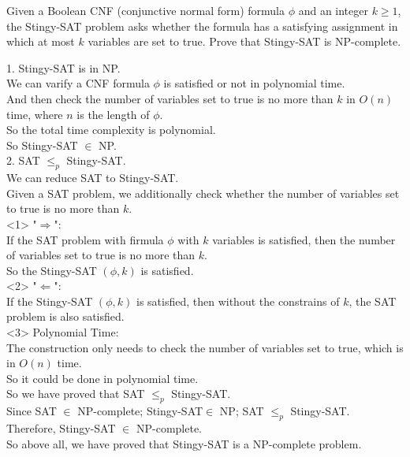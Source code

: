 \problem{}

Given a Boolean CNF (conjunctive normal form) formula $\phi$ and an integer $k \geq 1$, the Stingy-SAT problem asks whether the formula has a satisfying assignment in which at most $k$ variables are set to true. Prove that Stingy-SAT is NP-complete.

\solution{}

1. Stingy-SAT is in NP.\\
We can varify a CNF formula \(\phi\) is satisfied or not in polynomial time.\\
And then check the number of variables set to true is no more than \(k\) in $O(n)$ time, where $n$ is the length of $\phi$.\\
So the total time complexity is polynomial.\\
So Stingy-SAT $\in$ NP.\\

2. SAT $\leq_p$ Stingy-SAT.\\
We can reduce SAT to Stingy-SAT.\\
Given a SAT problem, we additionally check whether the number of variables set to true is no more than \(k\).\\

<1> "$\Rightarrow$":\\
If the SAT problem with firmula $\phi$ with $k$ variables is satisfied, then the number of variables set to true is no more than \(k\).\\
So the Stingy-SAT $(\phi,k)$ is satisfied.\\

<2> "$\Leftarrow$":\\
If the Stingy-SAT $(\phi,k)$ is satisfied, then without the constrains of $k$, the SAT problem is also satisfied.\\

<3> Polynomial Time:\\
The construction only needs to check the number of variables set to true, which is in $O(n)$ time.\\
So it could be done in polynomial time.\\
So we have proved that SAT $\leq_p$ Stingy-SAT.\\

Since SAT $\in$ NP-complete; Stingy-SAT$\in$ NP; SAT $\leq_p$ Stingy-SAT.\\
Therefore, Stingy-SAT $\in$ NP-complete.\\

So above all, we have proved that Stingy-SAT is a NP-complete problem.

\newpage